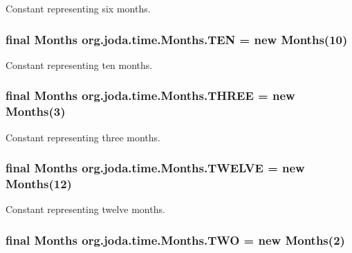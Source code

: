 Constant representing six months. \hypertarget{classorg_1_1joda_1_1time_1_1_months_ad19ea5259ccdc135061b36ef9aee8709}{
\subsubsection[{T\-E\-N}]{\setlength{\rightskip}{0pt plus 5cm}final {\bf Months} org.\-joda.\-time.\-Months.\-T\-E\-N = new {\bf Months}(10)\hspace{0.3cm}{\ttfamily [static]}}}\label{classorg_1_1joda_1_1time_1_1_months_ad19ea5259ccdc135061b36ef9aee8709}
Constant representing ten months. \hypertarget{classorg_1_1joda_1_1time_1_1_months_a3c294b81bb571244c9816ddc1ddec9a3}{
\subsubsection[{T\-H\-R\-E\-E}]{\setlength{\rightskip}{0pt plus 5cm}final {\bf Months} org.\-joda.\-time.\-Months.\-T\-H\-R\-E\-E = new {\bf Months}(3)\hspace{0.3cm}{\ttfamily [static]}}}\label{classorg_1_1joda_1_1time_1_1_months_a3c294b81bb571244c9816ddc1ddec9a3}
Constant representing three months. \hypertarget{classorg_1_1joda_1_1time_1_1_months_a8c35e13f3b97f8ef723778b04246ead5}{
\subsubsection[{T\-W\-E\-L\-V\-E}]{\setlength{\rightskip}{0pt plus 5cm}final {\bf Months} org.\-joda.\-time.\-Months.\-T\-W\-E\-L\-V\-E = new {\bf Months}(12)\hspace{0.3cm}{\ttfamily [static]}}}\label{classorg_1_1joda_1_1time_1_1_months_a8c35e13f3b97f8ef723778b04246ead5}
Constant representing twelve months. \hypertarget{classorg_1_1joda_1_1time_1_1_months_a394e94540e6eae38a29f81adc506d28a}{
\subsubsection[{T\-W\-O}]{\setlength{\rightskip}{0pt plus 5cm}final {\bf Months} org.\-joda.\-time.\-Months.\-T\-W\-O = new {\bf Months}(2)\hspace{0.3cm}{\ttfamily [static]}}}\label{classorg_1_1joda_1_1time_1_1_months_a394e94540e6eae38a29f81adc506d28a}
